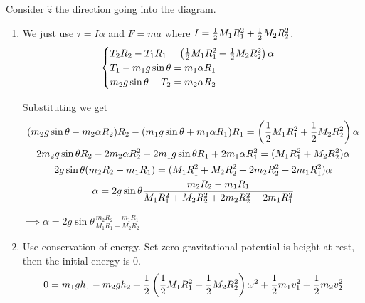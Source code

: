\documentclass[10pt]{extarticle}
\begin{document}
\begin{solution}
    Consider $\hat z$ the direction going into the diagram.

    \begin{enumerate}
        \item \label{itm:24_jan_24_p2_ex_1:1} We just use $\tau = I \alpha$ and $F = ma$ where $I = \frac{1}{2} M_1 R_1^2 + \frac{1}{2} M_2 R_2^2$.
              \begin{align}
                  \begin{cases}
                      T_2 R_2 - T_1 R_1 = \left(\frac{1}{2} M_1 R_1^2 + \frac{1}{2} M_2 R_2^2 \right) \alpha \\
                      T_1 - m_1 g \sin \theta = m_1 \alpha R_1                                   \\
                      m_2 g \sin \theta - T_2 = m_2 \alpha R_2                                   \\
                  \end{cases}
              \end{align}

              Substituting we get
              \begin{gather}
                  (m_2 g \sin \theta - m_2 \alpha R_2) R_2 - (m_1 g \sin \theta + m_1 \alpha R_1) R_1 = \left(\frac{1}{2} M_1 R_1^2 + \frac{1}{2} M_2 R_2^2 \right) \alpha\\
                  2m_2 g \sin \theta R_2 - 2m_2 \alpha R_2^2 - 2m_1 g \sin \theta R_1 + 2m_1 \alpha R_1^2 = (M_1 R_1^2 + M_2 R_2^2) \alpha \\
                  2g \sin \theta (m_2 R_2 - m_1 R_1) = (M_1 R_1^2 + M_2 R_2^2 + 2m_2 R_2^2 - 2m_1 R_1^2) \alpha \\
                  \alpha = 2g \sin \theta \frac{m_2 R_2 - m_1 R_1}{M_1 R_1^2 + M_2 R_2^2 + 2m_2 R_2^2 - 2m_1 R_1^2}
              \end{gather}

              $\implies \alpha = 2g \sin \theta \frac{m_2 R_2 - m_1 R_1}{M_1 R_1 + M_2 R_2}$

        \item Use conservation of energy.
              Set zero gravitational potential is height at rest, then the initial energy is $0$.
              \begin{equation}
                  0 = m_1 g h_1 - m_2 g h_2 + \frac{1}{2} \left( \frac{1}{2} M_1 R_1^2 + \frac{1}{2} M_2 R_2^2 \right) \omega^2 + \frac{1}{2} m_1 v_1^2 + \frac{1}{2} m_2 v_2^2
              \end{equation}


\end{enumerate}
\end{solution}
\end{document}
